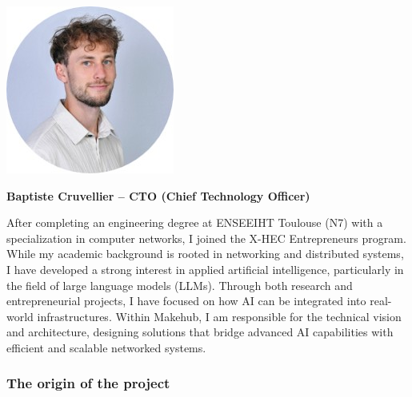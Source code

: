 \documentclass[english]{article}
\begin{document}
\noindent
\begin{minipage}[c]{0.2\textwidth}
    \centering
    \includegraphics[width=0.9\linewidth]{images/baptiste.jpg}
\end{minipage}%
\hfill
\begin{minipage}[c]{0.75\textwidth}
    \textbf{\large Baptiste Cruvellier – CTO (Chief Technology Officer)}
    \vspace{0.3em}

    \noindent After completing an engineering degree at ENSEEIHT Toulouse (N7) with a specialization in computer networks, I joined the X-HEC Entrepreneurs program.
    While my academic background is rooted in networking and distributed systems, I have developed a strong interest in applied artificial intelligence, particularly in the field of large language models (LLMs).
    Through both research and entrepreneurial projects, I have focused on how AI can be integrated into real-world infrastructures.
    Within Makehub, I am responsible for the technical vision and architecture, designing solutions that bridge advanced AI capabilities with efficient and scalable networked systems.
\end{minipage}

\vspace{1.5em}


\subsubsection{The origin of the project}
\end{document}
